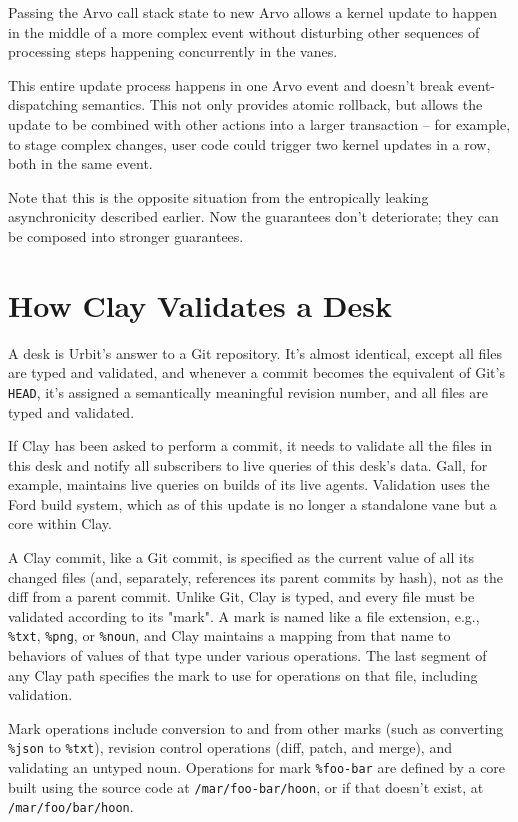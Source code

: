 \documentclass[twoside]{article}
\begin{document}
Passing the Arvo call stack state to new Arvo allows a kernel update to happen in the middle of a more complex event without disturbing other sequences of processing steps happening concurrently in the vanes.

This entire update process happens in one Arvo event and doesn’t break event-dispatching semantics. This not only provides atomic rollback, but allows the update to be combined with other actions into a larger transaction – for example, to stage complex changes, user code could trigger two kernel updates in a row, both in the same event.

Note that this is the opposite situation from the entropically leaking asynchronicity described earlier. Now the guarantees don’t deteriorate; they can be composed into stronger guarantees.


\section{How Clay Validates a Desk}

A desk is Urbit's answer to a Git repository. It's almost identical, except all files are typed and validated, and whenever a commit becomes the equivalent of Git’s \lstinline[style=inlinecode]{HEAD}, it’s assigned a semantically meaningful revision number, and all files are typed and validated.

If Clay has been asked to perform a commit, it needs to validate all the files in this desk and notify all subscribers to live queries of this desk's data. Gall, for example, maintains live queries on builds of its live agents. Validation uses the Ford build system, which as of this update is no longer a standalone vane but a core within Clay.

A Clay commit, like a Git commit, is specified as the current value of all its changed files (and, separately, references its parent commits by hash), not as the diff from a parent commit. Unlike Git, Clay is typed, and every file must be validated according to its "mark". A mark is named like a file extension, e.g., \lstinline[style=inlinecode]{%txt}, \lstinline[style=inlinecode]{%png}, or \lstinline[style=inlinecode]{%noun}, and Clay maintains a mapping from that name to behaviors of values of that type under various operations. The last segment of any Clay path specifies the mark to use for operations on that file, including validation.

Mark operations include conversion to and from other marks (such as converting \lstinline[style=inlinecode]{%json} to \lstinline[style=inlinecode]{%txt}), revision control operations (diff, patch, and merge), and validating an untyped noun. Operations for mark \lstinline[style=inlinecode]{%foo-bar} are defined by a core built using the source code at \lstinline[style=inlinecode]{/mar/foo-bar/hoon}, or if that doesn't exist, at \lstinline[style=inlinecode]{/mar/foo/bar/hoon}.
\end{document}
